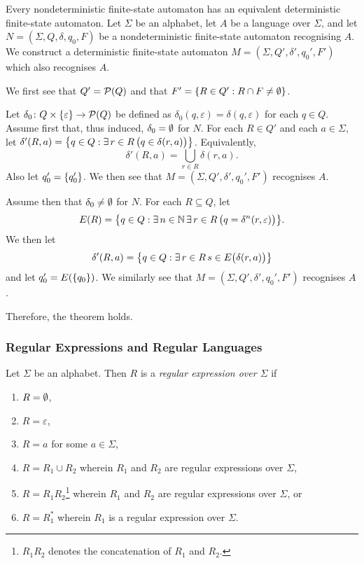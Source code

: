 \Bth
  \label{thm1}
  Every nondeterministic finite-state automaton has an equivalent deterministic finite-state automaton.
\Eth
\Bpr
  Let \(\Sigma\) be an alphabet, let \(A\) be a language over \(\Sigma\), and let \(N = (\Sigma, Q, \delta, q_0, F)\) be
  a nondeterministic finite-state automaton recognising \(A\). We construct a deterministic finite-state automaton
  \(M = (\Sigma, Q', \delta', q_0', F')\) which also recognises \(A\).

  We first see that \(Q' = \pow(Q)\) and that \(F' = \set{R \in Q' : R \cap F \neq \nset}\).

  Let \(\map{\delta_0}{Q \times \set{\varepsilon}}{\pow(Q)}\) be defined as \(\delta_0(q, \varepsilon) = \delta(q,
  \varepsilon)\) for each \(q \in Q\). Assume first that, thus induced, \(\delta_0 = \nset\) for \(N\). For each
  \(R \in Q'\) and each \(a \in \Sigma\), let \(\delta'(R, a) = \set*{q \in Q : \exists \, r \in R \, \big(q
  \in \delta(r, a)\big)}\).
  Equivalently,
  \[
    \delta'(R, a) = \bigcup_{r \in R} \delta(r, a).
  \]
  Also let \(q_0' = \set{q_0'}\). We then see that \(M = (\Sigma, Q', \delta', q_0', F')\) recognises \(A\).

  Assume then that \(\delta_0 \neq \nset\) for \(N\). For each \(R \subseteq Q\), let
  \[
    E(R) = \set*{q \in Q : \exists \, n \in \setnat \, \exists \, r \in R \, \big(q = \delta^n(r, \varepsilon)\big)}.
  \]
  We then let
  \[
    \delta'(R, a) = \set*{q \in Q : \exists \, r \in R \, s \in E\big(\delta(r, a)\big)}
  \]
  and let \(q_0' = E(\set{q_0})\). We similarly see that \(M = (\Sigma, Q', \delta', q_0', F')\) recognises \(A\).

  Therefore, the theorem holds.
\Epr

\subsubsection{Regular Expressions and Regular Languages}

\Bdf
  Let \(\Sigma\) be an alphabet. Then \(R\) is a \emph{regular expression over \(\Sigma\)} if
  \begin{enumerate}
    \item \(R = \nset\),
    \item \(R = \varepsilon\),
    \item \(R = a\) for some \(a \in \Sigma\),
    \item \(R = R_1 \cup R_2\) wherein \(R_1\) and \(R_2\) are regular expressions over \(\Sigma\),
    \item \(R = R_1 R_2\)\footnote{\(R_1 R_2\) denotes the concatenation of \(R_1\) and \(R_2\).} wherein \(R_1\) and
    \(R_2\) are regular expressions over \(\Sigma\), or
    \item \(R = R_1^*\) wherein \(R_1\) is a regular expression over \(\Sigma\).
  \end{enumerate}
\Edf

